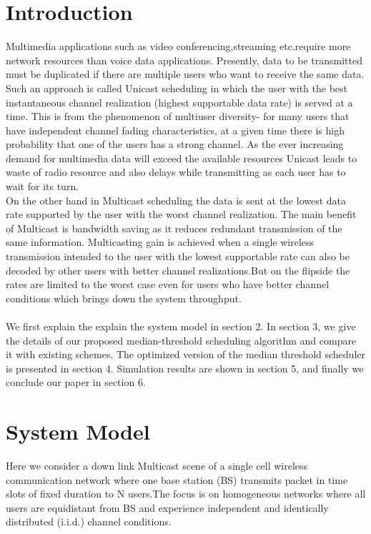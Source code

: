 \documentclass[conference]{IEEEtran}
\begin{document}
\section{Introduction}
 \IEEEPARstart Multimedia applications such as video conferencing,streaming etc.require more network resources than voice data applications. Presently, data to be transmitted must be duplicated if there are multiple users who want to receive the same data. Such an approach is called Unicast scheduling in which the user with the best instantaneous channel realization (highest supportable data rate) is served at a time.  This is from the phenomenon of multiuser diversity- for many users that have independent channel fading characteristics, at a given time there is high probability that one of the users has a strong channel. As the ever increasing demand for multimedia data will exceed the available resources Unicast leads to waste of radio resource and also delays while transmitting as each user has to wait for its turn.\\

On the other hand in Multicast scheduling the data is sent at the lowest data rate supported by the user with the worst channel realization. The main benefit of Multicast is bandwidth saving as it reduces redundant transmission of the same information. Multicasting gain is achieved when a single wireless transmission intended to the user with the lowest supportable rate can also be decoded by other users with better channel realizations.But on the flipside the rates are limited to the worst case even for users who have better channel conditions which brings down the system throughput.\\
\\
We first explain the explain the system model in section 2. In section 3, we give the details of our proposed median-threshold scheduling algorithm and compare it with existing schemes. The optimized version of the median threshold scheduler is presented in section 4. Simulation results are shown in section 5, and finally we conclude our paper in section 6.

\section{System Model}

Here we consider a down link Multicast scene of a single cell wireless communication network where one base station (BS) transmits packet in time slots of fixed duration to N users.The focus is on homogeneous networks where all users are equidistant from BS and experience independent and identically distributed (i.i.d.) channel conditions.
\end{document}
